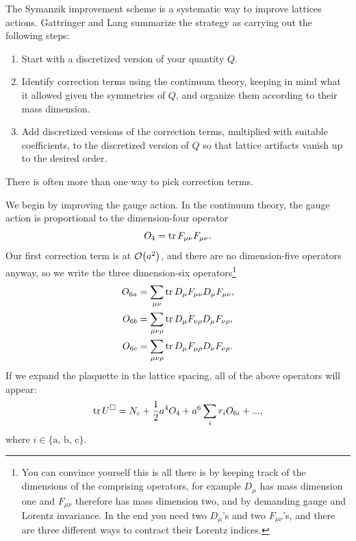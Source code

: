 The Symanzik improvement scheme \cite{symanzik_continuum_1983,
symanzik_continuum_1983-1,curci_symanziks_1983,luscher_shell_1985} 
is a systematic way to
improve lattices actions. Gattringer and Lang summarize the strategy as
carrying out the following steps:
\begin{enumerate}
  \item Start with a discretized version of your quantity $Q$.
  \item Identify correction terms using the continuum theory, keeping in mind
        what it allowed given the symmetries of $Q$, and organize them according
        to their mass dimension.
  \item Add discretized versions of the correction terms, multiplied with
        suitable coefficients, to the discretized version of $Q$ so that 
        lattice artifacts vanish up to the desired order.
\end{enumerate}
There is often more than one way to pick correction terms.

We begin by improving the gauge action. In the continuum theory, the gauge
action is proportional to the dimension-four operator
\begin{equation}
  O_4 = \tr F_{\mu\nu}F_{\mu\nu}.
\end{equation}
Our first correction term is at $\order{a^2}$, and there are no dimension-five
operators anyway, so we write the three dimension-six operators\footnote{You 
can convince yourself this is all there is by keeping track of the
dimensions of the comprising operators, for example $D_\mu$ has mass dimension
one and $F_{\mu\nu}$ therefore has mass dimension two, and by demanding gauge
and Lorentz invariance. In the end you need two $D_\mu$'s and two 
$F_{\mu\nu}$'s, and there are three different ways to contract their 
Lorentz indices.}
\begin{equation}\begin{aligned}
  O_{6a}&=\sum_{\mu\nu}\tr D_\mu F_{\mu\nu} D_\mu F_{\mu\nu},\\
  O_{6b}&=\sum_{\mu\nu\rho}\tr D_\mu F_{\nu\rho} D_\mu F_{\nu\rho},\\
  O_{6c}&=\sum_{\mu\nu\rho}\tr D_\mu F_{\mu\rho} D_\nu F_{\nu\rho}.
\end{aligned}\end{equation}
If we expand the plaquette in the lattice spacing, all of the above
operators will appear:
\begin{equation}\label{eq:trPlaqExpansion}
  \tr U^\square = N_c + \frac{1}{2}a^4O_4+a^6\sum_i r_iO_{6i} + ...,
\end{equation}
where $i\in\{\text{a, b, c}\}$.


